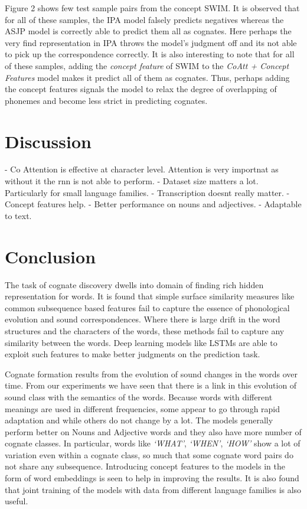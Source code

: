 \documentclass[11pt,letterpaper]{article}
\begin{document}
Figure 2 shows few test sample pairs from the concept SWIM. It is observed that for all of these samples, the IPA model falsely predicts negatives whereas the ASJP model is correctly able to predict them all as cognates. Here perhaps the very find representation in IPA throws the model's judgment off and its not able to pick up the correspondence correctly. It is also interesting to note that for all of these samples, adding the \textit{concept feature} of SWIM to the \textit{CoAtt + Concept Features} model makes it predict all of them as cognates. Thus, perhaps adding the concept features signals the model to relax the degree of overlapping of phonemes and become less strict in predicting cognates.

\section{Discussion}
- Co Attention is effective at character level. Attention is very importnat as without it the rnn is not able to perform.
- Dataset size matters a lot. Particularly for small language families.
- Transcription doesnt really matter.
- Concept features help.
- Better performance on nouns and adjectives.
- Adaptable to text.

\section{Conclusion}

The task of cognate discovery dwells into domain of finding rich hidden representation for words. It is found that simple surface similarity measures like common subsequence based features fail to capture the essence of phonological evolution and sound correspondences. Where there is large drift in the word structures and the characters of the words, these methods fail to capture any similarity between the words. Deep learning models like LSTMs are able to exploit such features to make better judgments on the prediction task. 

Cognate formation results from the evolution of sound changes in the words over time. From our experiments we have seen that there is a link in this evolution of sound class with the semantics of the words. Because words with different meanings are used in different frequencies, some appear to go through rapid adaptation and while others do not change by a lot. The models generally perform better on Nouns and Adjective words and they also have more number of cognate classes. In particular, words like \textit{`WHAT'}, \textit{`WHEN'}, \textit{`HOW'} show a lot of variation even within a cognate class, so much that some cognate word pairs do not share any subsequence. Introducing concept features to the models in the form of word embeddings is seen to help in improving the results. It is also found that joint training of the models with data from different language families is also useful.
\end{document}
